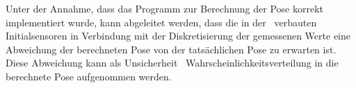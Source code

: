Unter der Annahme, dass das Programm zur Berechnung der Pose korrekt implementiert wurde, kann abgeleitet werden, dass die in der \Ar\ verbauten Initialsensoren in Verbindung mit der Diskretisierung der gemessenen Werte eine Abweichung der berechneten Pose von der tatsächlichen Pose zu erwarten ist.
Diese Abweichung kann als Unsicherheit \bzw\ Wahrscheinlichkeitsverteilung in die berechnete Pose aufgenommen werden.






